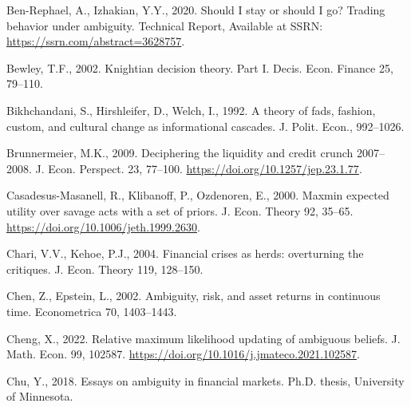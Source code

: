 \documentclass[12pt,a4paper]{article}
\newenvironment{biblock}{%
  \par\vspace{2pt}\noindent\small%
  \ignorespaces
}{%
  \par\vspace{2pt}%
}
\begin{document}
\begin{biblock}
Ben-Rephael, A., Izhakian, Y.Y., 2020. Should I stay or should I go? Trading behavior under ambiguity. Technical Report, Available at SSRN: \url{https://ssrn.com/abstract=3628757}.
\end{biblock}

\begin{biblock}
Bewley, T.F., 2002. Knightian decision theory. Part I. Decis. Econ. Finance 25, 79--110.
\end{biblock}

\begin{biblock}
Bikhchandani, S., Hirshleifer, D., Welch, I., 1992. A theory of fads, fashion, custom, and cultural change as informational cascades. J. Polit. Econ., 992--1026.
\end{biblock}

\begin{biblock}
Brunnermeier, M.K., 2009. Deciphering the liquidity and credit crunch 2007--2008. J. Econ. Perspect. 23, 77--100. \url{https://doi.org/10.1257/jep.23.1.77}.
\end{biblock}

\begin{biblock}
Casadesus-Masanell, R., Klibanoff, P., Ozdenoren, E., 2000. Maxmin expected utility over savage acts with a set of priors. J. Econ. Theory 92, 35--65. \url{https://doi.org/10.1006/jeth.1999.2630}.
\end{biblock}

\begin{biblock}
Chari, V.V., Kehoe, P.J., 2004. Financial crises as herds: overturning the critiques. J. Econ. Theory 119, 128--150.
\end{biblock}

\begin{biblock}
Chen, Z., Epstein, L., 2002. Ambiguity, risk, and asset returns in continuous time. Econometrica 70, 1403--1443.
\end{biblock}

\begin{biblock}
Cheng, X., 2022. Relative maximum likelihood updating of ambiguous beliefs. J. Math. Econ. 99, 102587. \url{https://doi.org/10.1016/j.jmateco.2021.102587}.
\end{biblock}

\begin{biblock}
Chu, Y., 2018. Essays on ambiguity in financial markets. Ph.D. thesis, University of Minnesota.
\end{biblock}
\end{document}
